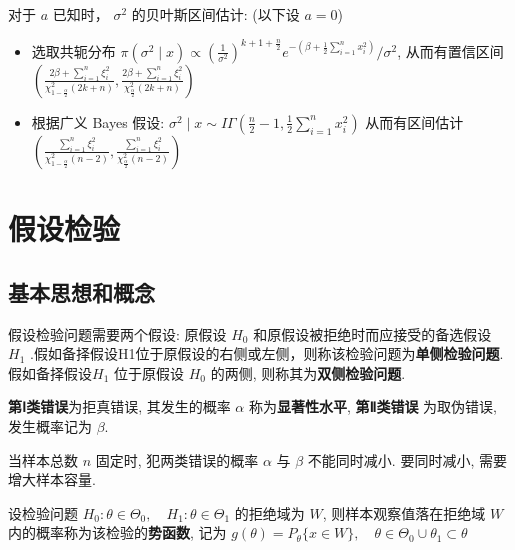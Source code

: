 \documentclass[10pt]{yerbaformat}
\begin{document}
\par 对于 $a$ 已知时， $\sigma^{2}$ 的贝叶斯区间估计: (以下设 $a=0$)

\begin{itemize}
    \item 选取共轭分布 $\pi\left(\sigma^{2} \mid x\right) \propto \left(\frac{1}{\sigma^{2}}\right)^{k+1+\frac{n}{2}} e^{-\left(\beta+\frac{1}{2} \sum_{i=1}^{n} x_{i}^{2}\right)} / \sigma^{2}$, 从而有置信区间 $\left(\frac{2 \beta+\sum_{i=1}^{n} \xi_{i}^{2}}{\chi_{1-\frac{\alpha}{2}}^{2}(2 k+n)}, \frac{2 \beta+\sum_{i=1}^{n} \xi_{i}^{2}}{\chi_{\frac{\alpha}{2}}^{2}(2 k+n)}\right)$
    \item 根据广义 Bayes 假设: $\sigma^{2} \mid x \sim I \Gamma\left(\frac{n}{2}-1, \frac{1}{2} \sum_{i=1}^{n} x_{i}^{2}\right)$ 从而有区间估计 $\left(\frac{\sum_{i=1}^{n} \xi_{i}^{2}}{\chi_{1-\frac{\alpha}{2}}^{2}(n-2)}, \frac{\sum_{i=1}^{n} \xi_{i}^{2}}{\chi_{\frac{\alpha}{2}}^{2}(n-2)}\right)$
\end{itemize}

\section{假设检验}

\subsection{基本思想和概念}

\begin{definition}
    假设检验问题需要两个假设: 原假设 $H_0$ 和原假设被拒绝时而应接受的备选假设 $H_1$ .假如备择假设H1位于原假设的右侧或左侧，则称该检验问题为\textbf{单侧检验问题}. 假如备择假设$H_1$ 位于原假设 $H_0$ 的两侧, 则称其为\textbf{双侧检验问题}.
\end{definition}

\begin{definition}[错误类别]
    \textbf{第Ⅰ类错误}为拒真错误, 其发生的概率 $\alpha$ 称为\textbf{显著性水平}, \textbf{第Ⅱ类错误} 为取伪错误, 发生概率记为 $\beta$.
\end{definition}

\par 当样本总数 $n$ 固定时, 犯两类错误的概率 $\alpha$ 与 $\beta$ 不能同时减小. 要同时减小, 需要增大样本容量.

\begin{definition}
    设检验问题 $H_{0}: \theta \in \Theta_{0}, \quad H_{1}: \theta \in \Theta_{1}$ 的拒绝域为 $W$, 则样本观察值落在拒绝域 $W$ 内的概率称为该检验的\textbf{势函数}, 记为 $g(\theta)=P_{\theta}\{x \in W\}, \quad \theta \in \Theta_{0} \cup \theta_{1} \subset \theta $
\end{definition}
\end{document}
